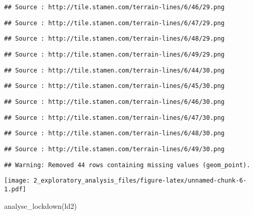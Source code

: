 \documentclass[
]{article}
\newenvironment{Shaded}{\begin{snugshade}}{\end{snugshade}}
\newcommand{\FunctionTok}[1]{\textcolor[rgb]{0.00,0.00,0.00}{#1}}
\newcommand{\NormalTok}[1]{#1}
\begin{document}
\begin{verbatim}
## Source : http://tile.stamen.com/terrain-lines/6/46/29.png
\end{verbatim}

\begin{verbatim}
## Source : http://tile.stamen.com/terrain-lines/6/47/29.png
\end{verbatim}

\begin{verbatim}
## Source : http://tile.stamen.com/terrain-lines/6/48/29.png
\end{verbatim}

\begin{verbatim}
## Source : http://tile.stamen.com/terrain-lines/6/49/29.png
\end{verbatim}

\begin{verbatim}
## Source : http://tile.stamen.com/terrain-lines/6/44/30.png
\end{verbatim}

\begin{verbatim}
## Source : http://tile.stamen.com/terrain-lines/6/45/30.png
\end{verbatim}

\begin{verbatim}
## Source : http://tile.stamen.com/terrain-lines/6/46/30.png
\end{verbatim}

\begin{verbatim}
## Source : http://tile.stamen.com/terrain-lines/6/47/30.png
\end{verbatim}

\begin{verbatim}
## Source : http://tile.stamen.com/terrain-lines/6/48/30.png
\end{verbatim}

\begin{verbatim}
## Source : http://tile.stamen.com/terrain-lines/6/49/30.png
\end{verbatim}

\begin{verbatim}
## Warning: Removed 44 rows containing missing values (geom_point).
\end{verbatim}

\texttt{[image: 2\_exploratory\_analysis\_files/figure-latex/unnamed-chunk-6-1.pdf]}

\begin{Shaded}
\begin{Highlighting}[]
\FunctionTok{analyse\_lockdown}\NormalTok{(ld2)}
\end{Highlighting}
\end{Shaded}
\end{document}
